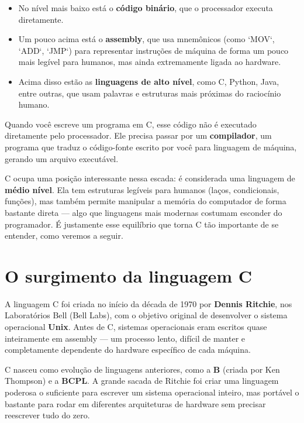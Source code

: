 \documentclass[12pt,a4paper,oneside]{extreport}
\begin{document}
\begin{itemize}

    \item No nível mais baixo está o \textbf{código binário}, que o processador executa diretamente.
    \item Um pouco acima está o \textbf{assembly}, que usa mnemônicos (como `MOV`, `ADD`, `JMP`) para representar instruções de máquina de forma um pouco mais legível para humanos, mas ainda extremamente ligada ao hardware.
    \item Acima disso estão as \textbf{linguagens de alto nível}, como C, Python, Java, entre outras, que usam palavras e estruturas mais próximas do raciocínio humano.
    
\end{itemize}


Quando você escreve um programa em C, esse código não é executado diretamente pelo processador. Ele precisa passar por um \textbf{compilador}, um programa que traduz o código-fonte escrito por você para linguagem de máquina, gerando um arquivo executável.

C ocupa uma posição interessante nessa escada: é considerada uma linguagem de \textbf{médio nível}. Ela tem estruturas legíveis para humanos (laços, condicionais, funções), mas também permite manipular a memória do computador de forma bastante direta — algo que linguagens mais modernas costumam esconder do programador. É justamente esse equilíbrio que torna C tão importante de se entender, como veremos a seguir.


\section{O surgimento da linguagem C}

A linguagem C foi criada no início da década de 1970 por \textbf{Dennis Ritchie}, nos Laboratórios Bell (Bell Labs), com o objetivo original de desenvolver o sistema operacional \textbf{Unix}. Antes de C, sistemas operacionais eram escritos quase inteiramente em assembly — um processo lento, difícil de manter e completamente dependente do hardware específico de cada máquina.

C nasceu como evolução de linguagens anteriores, como a \textbf{B} (criada por Ken Thompson) e a \textbf{BCPL}. A grande sacada de Ritchie foi criar uma linguagem poderosa o suficiente para escrever um sistema operacional inteiro, mas portável o bastante para rodar em diferentes arquiteturas de hardware sem precisar reescrever tudo do zero.
\end{document}
